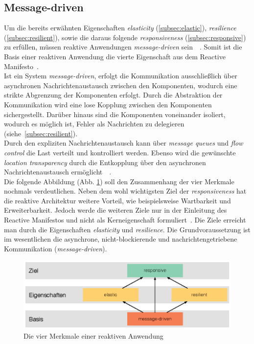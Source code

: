 \subsection{Message-driven}\label{subsec:messagedriven}
Um die bereits erwähnten Eigenschaften \textit{elasticity} (\ref{subsec:elastic}), \textit{resilience} (\ref{subsec:resilient}), sowie die daraus folgende \textit{responsiveness} (\ref{subsec:responsive}) zu erfüllen, müssen reaktive Anwendungen \textit{message-driven} sein~\cite{webber_what_2014}~\cite[S.~43]{kuhn_reactive_2015}. Somit ist die Basis einer reaktiven Anwendung die vierte Eigenschaft aus dem Reactive Manifesto~\cite{boner_reactive_2014}.\\
Ist ein System \textit{message-driven}, erfolgt die Kommunikation ausschließlich über asynchronen Nachrichtenaustausch zwischen den Komponenten, wodurch eine strikte Abgrenzung der Komponenten erfolgt. Durch die Abstraktion der Kommunikation wird eine lose Kopplung zwischen den Komponenten sichergestellt. Darüber hinaus sind die Komponenten voneinander isoliert, wodurch es möglich ist, Fehler als Nachrichten zu delegieren (siehe~\ref{subsec:resilient}).\\
Durch den expliziten Nachrichtenaustausch kann über \textit{message queues} und \textit{flow control} die Last verteilt und kontrolliert werden. Ebenso wird die gewünschte \textit{location transparency} durch die Entkopplung über den asynchronen Nachrichtenaustausch ermöglicht~\cite{boner_reactive_2015}~\cite[S.~43]{kuhn_reactive_2015}.\\
Die folgende Abbildung (Abb. \ref{fig:four-traits}) soll den Zusammenhang der vier Merkmale nochmals verdeutlichen. Neben dem wohl wichtigsten Ziel der \textit{responsiveness} hat die reaktive Architektur weitere Vorteil, wie beispielsweise Wartbarkeit und Erweiterbarkeit. Jedoch werde die weiteren Ziele nur in der Einleitung des Reactive Manifestos und nicht als Kerneigenschaft formuliert~\cite{boner_reactive_2014}. Die Ziele erreicht man durch die Eigenschaften \textit{elasticity} und \textit{resilience}. Die Grundvoraussetzung ist im wesentlichen die asynchrone, nicht-blockierende und nachrichtengetriebene Kommunikation (\textit{message-driven}).

\begin{figure}[H]
 \centering
 \includegraphics[width=1.0\textwidth]{3-Grundlagen/four-traits/four-traits.eps}
 \caption{Die vier Merkmale einer reaktiven Anwendung \cite{kuhn_code_2015}}
 \label{fig:four-traits}
\end{figure}

